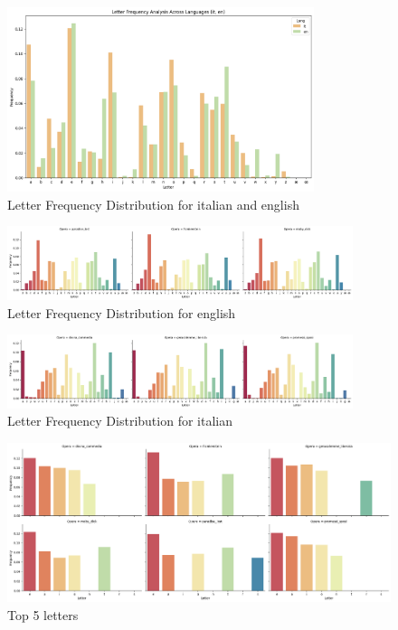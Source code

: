 \begin{figure}[H]
  \centering
  \includegraphics[width=0.8\textwidth]{media/qualitative analysis/letter_freq_dist_lang.png}
  \caption{Letter Frequency Distribution for italian and english}
  \label{fig:letter_freq_dist_lang}
\end{figure}

\begin{figure}[H]
  \centering
  \includegraphics[width=0.9\textwidth]{media/qualitative analysis/letter_freq_dist_lang_en.png}
  \caption{Letter Frequency Distribution for english}
  \label{fig:letter_freq_dist_lang_en}
\end{figure}

\begin{figure}[H]
  \centering
  \includegraphics[width=0.9\textwidth]{media/qualitative analysis/letter_freq_dist_lang_it.png}
  \caption{Letter Frequency Distribution for italian}
  \label{fig:letter_freq_dist_lang_it}
\end{figure}

\begin{figure}[H]
  \centering
  \includegraphics[width=1\textwidth]{media/qualitative analysis/top_5_letters.png}
  \caption{Top 5 letters}
  \label{fig:top_5_letters}
\end{figure}

